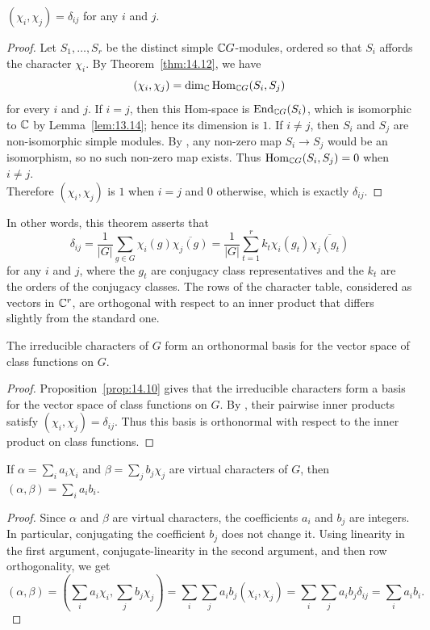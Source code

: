 \documentclass[../Odyssey_Project.tex]{subfiles}
\begin{document}
\begin{namedtheorem}
\label{thm:row-orthogonality}
$(\chi_i, \chi_j) = \delta_{ij}$ for any $i$ and $j$.
\end{namedtheorem}
\begin{proof}
    Let $S_1,\ldots,S_r$ be the distinct simple $\mathbb{C} G$-modules, ordered so that $S_i$ affords the character $\chi_i$. By Theorem~\ref{thm:14.12}, we have
    \[
        (\chi_i,\chi_j)=\dim_{\mathbb{C}}\operatorname{Hom}_{\mathbb{C} G}(S_i,S_j)
    \]
    for every $i$ and $j$. If $i=j$, then this Hom-space is $\operatorname{End}_{\mathbb{C} G}(S_i)$, which is isomorphic to $\mathbb{C}$ by Lemma~\ref{lem:13.14}; hence its dimension is $1$. If $i\neq j$, then $S_i$ and $S_j$ are non-isomorphic simple modules. By , any non-zero map $S_i\to S_j$ would be an isomorphism, so no such non-zero map exists. Thus $\operatorname{Hom}_{\mathbb{C} G}(S_i,S_j)=0$ when $i\neq j$.\\
    Therefore $(\chi_i,\chi_j)$ is $1$ when $i=j$ and $0$ otherwise, which is exactly $\delta_{ij}$.
\end{proof}

In other words, this theorem asserts that
\[
    \delta_{ij} = \frac{1}{|G|} \sum_{g \in G} \chi_i(g)\overline{\chi_j(g)} = \frac{1}{|G|} \sum_{t=1}^{r} k_t \chi_i(g_t)\overline{\chi_j(g_t)}
\]
for any $i$ and $j$, where the $g_t$ are conjugacy class representatives and the $k_t$ are the orders of the conjugacy classes. The rows of the character table, considered as vectors in $\mathbb{C}^r$, are orthogonal with respect to an inner product that differs slightly from the standard one.

\begin{corollary}
\label{cor:15.1}
The irreducible characters of $G$ form an orthonormal basis for the vector space of class functions on $G$.
\end{corollary}
\begin{proof}
    Proposition~\ref{prop:14.10} gives that the irreducible characters form a basis for the vector space of class functions on $G$. By , their pairwise inner products satisfy $(\chi_i,\chi_j)=\delta_{ij}$. Thus this basis is orthonormal with respect to the inner product on class functions.
\end{proof}

\begin{corollary}
\label{cor:15.2}
If $\alpha = \sum_i a_i \chi_i$ and $\beta = \sum_j b_j \chi_j$ are virtual characters of $G$, then $(\alpha, \beta) = \sum_i a_i b_i$.
\end{corollary}
\begin{proof}
    Since $\alpha$ and $\beta$ are virtual characters, the coefficients $a_i$ and $b_j$ are integers. In particular, conjugating the coefficient $b_j$ does not change it. Using linearity in the first argument, conjugate-linearity in the second argument, and then row orthogonality, we get
    \[
        (\alpha,\beta)
        =
        \left(\sum_i a_i\chi_i,\sum_j b_j\chi_j\right)
        =
        \sum_i\sum_j a_i b_j(\chi_i,\chi_j)
        =
        \sum_i\sum_j a_i b_j\delta_{ij}
        =
        \sum_i a_i b_i.
    \]
\end{proof}
\end{document}
